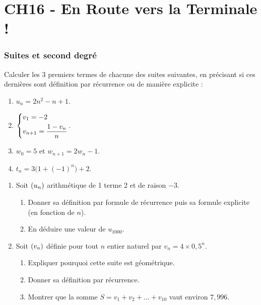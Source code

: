 \documentclass[a4paper,11pt]{article}
\author{Pierquet}
\title{\nomfichier}
\begin{document}

\pagestyle{fancy}

\part{CH16 - En Route vers la Terminale !}

\smallskip


\smallskip

\section{Suites et second degré}

\begin{cexercice}
Calculer les 3 premiers termes de chacune des suites suivantes, en précisant si ces dernières sont définition par récurrence ou de manière explicite :
%
\begin{enumerate}
	\item $u_n = 2n^2-n+1$.
	\item $\begin{dcases} v_1=-2 \\ v_{n+1}=\dfrac{1-v_n}{n} \end{dcases}$.
	\item $w_0=5$ et $w_{n+1}=2w_n-1$.
	\item $t_n=3\big(1+(-1)^n\big)+2$.
\end{enumerate}
\end{cexercice}

\begin{cexercice}
\vspace{-0.8\baselineskip}
\begin{enumerate}[leftmargin=*]
	\item Soit $\suiten$ arithmétique de 1 terme 2 et de raison $-3$.
	\begin{enumerate}
		\item Donner sa définition par formule de récurrence puis sa formule explicite (en fonction de $n$).
		\item En déduire une valeur de $u_{\num{1000}}$.
	\end{enumerate}
	\item Soit $\suiten[v]$ définie pour tout $n$ entier naturel par $v_n = 4 \times 0,5^n$.
	\begin{enumerate}
		\item Expliquer pourquoi cette suite est géométrique.
		\item Donner sa définition par récurrence.
		\item Montrer que la somme $S=v_1+v_2+\ldots+v_{10}$ vaut environ $7,996$.
	\end{enumerate}
\end{enumerate}
\end{cexercice}
\end{document}
